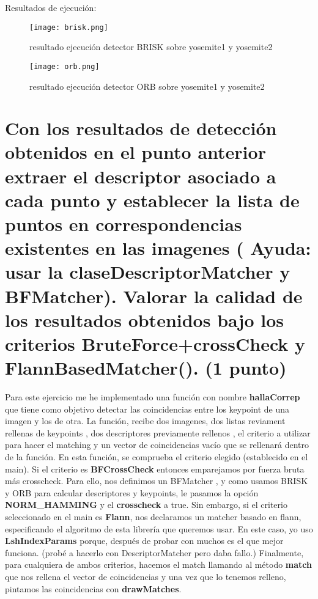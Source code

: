 
Resultados de ejecución:
\begin{figure}[H] %
\centering
\texttt{[image: brisk.png]}  %
\label{figura1}
\caption{resultado ejecución detector BRISK sobre yosemite1 y yosemite2}
\end{figure}

\begin{figure}[H] %
\centering
\texttt{[image: orb.png]}  %
\label{figura1}
\caption{resultado ejecución detector ORB sobre yosemite1 y yosemite2}
\end{figure}
\section{Con los resultados de detección obtenidos en el punto anterior extraer el
descriptor asociado a cada punto y establecer la lista de puntos en
correspondencias existentes en las imagenes ( Ayuda: usar la claseDescriptorMatcher y BFMatcher). Valorar la calidad de los resultados obtenidos
bajo los criterios BruteForce+crossCheck y FlannBasedMatcher(). (1 punto)}
Para este ejercicio me he implementado una función con nombre \textbf{hallaCorrep} que tiene como objetivo detectar las coincidencias
entre los keypoint de una imagen y los de otra. La función, recibe dos imagenes, dos listas reviament rellenas de keypoints , dos descriptores
previamente rellenos , el criterio a utilizar para hacer el matching y un vector de coincidencias vacío que se rellenará
dentro de la función. \newline
En esta función, se comprueba el criterio elegido (establecido en el main). Si el criterio es \textbf{BFCrossCheck} entonces
emparejamos por fuerza bruta más crosscheck. Para ello, nos definimos un BFMatcher , y como usamos BRISK  y ORB para calcular
descriptores y keypoints, le pasamos la opción \textbf{NORM\_HAMMING} y el \textbf{crosscheck} a true. \newline
Sin embargo, si el criterio seleccionado en el main es \textbf{Flann}, nos declaramos un matcher basado en flann, especificando
el algoritmo de esta librería que queremos usar. En este caso, yo uso \textbf{LshIndexParams} porque, después de probar con muchos
es el que mejor funciona. (probé a hacerlo con DescriptorMatcher pero daba fallo.) \newline
Finalmente, para cualquiera de ambos criterios, hacemos el match llamando al método \textbf{match} que nos rellena el vector
de coincidencias y una vez que lo tenemos relleno, pintamos las coincidencias con \textbf{drawMatches}.

